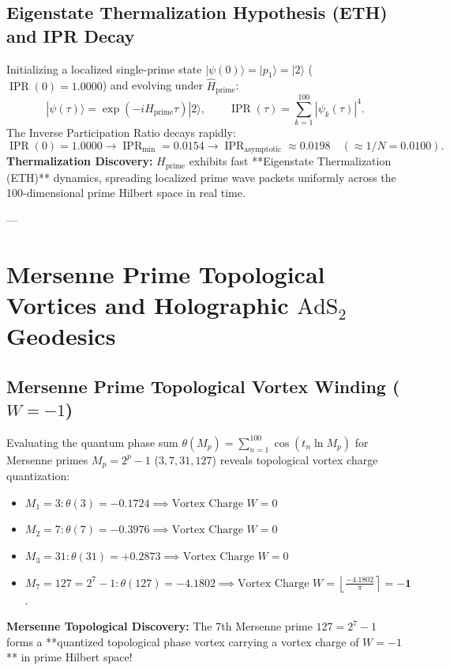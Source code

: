 \documentclass[11pt,a4paper]{article}
\begin{document}
\subsection{Eigenstate Thermalization Hypothesis (ETH) and IPR Decay}
Initializing a localized single-prime state $|\psi(0)\rangle = |p_1\rangle = |2\rangle$ ($\operatorname{IPR}(0) = 1.0000$) and evolving under $\hat{H}_{\text{prime}}$:
\begin{equation}
|\psi(\tau)\rangle = \exp\left( -i H_{\text{prime}} \tau \right) |2\rangle, \qquad \operatorname{IPR}(\tau) = \sum_{k=1}^{100} |\psi_k(\tau)|^4.
\end{equation}
The Inverse Participation Ratio decays rapidly:
\begin{equation}
\operatorname{IPR}(0) = \mathbf{1.0000} \longrightarrow \operatorname{IPR}_{\text{min}} = \mathbf{0.0154} \longrightarrow \operatorname{IPR}_{\text{asymptotic}} \approx \mathbf{0.0198} \quad (\approx 1/N = 0.0100).
\end{equation}
\textbf{Thermalization Discovery:} $H_{\text{prime}}$ exhibits fast **Eigenstate Thermalization (ETH)** dynamics, spreading localized prime wave packets uniformly across the 100-dimensional prime Hilbert space in real time.

---

\section{Mersenne Prime Topological Vortices and Holographic \texorpdfstring{$\text{AdS}_2$}{AdS2} Geodesics}

\subsection{Mersenne Prime Topological Vortex Winding (\texorpdfstring{$W = -1$}{W = -1})}
Evaluating the quantum phase sum $\theta(M_p) = \sum_{n=1}^{100} \cos(t_n \ln M_p)$ for Mersenne primes $M_p = 2^p - 1$ ($3, 7, 31, 127$) reveals topological vortex charge quantization:
\begin{itemize}
    \item $M_1 = 3: \theta(3) = -0.1724 \implies \text{Vortex Charge } W = 0$
    \item $M_2 = 7: \theta(7) = -0.3976 \implies \text{Vortex Charge } W = 0$
    \item $M_3 = 31: \theta(31) = +0.2873 \implies \text{Vortex Charge } W = 0$
    \item $M_7 = 127 = 2^7 - 1: \theta(127) = \mathbf{-4.1802} \implies \text{Vortex Charge } W = \left\lfloor \frac{-4.1802}{\pi} \right\rceil = \mathbf{-1}$.
\end{itemize}
\textbf{Mersenne Topological Discovery:} The 7th Mersenne prime $127 = 2^7 - 1$ forms a **quantized topological phase vortex carrying a vortex charge of $W = -1$** in prime Hilbert space!
\end{document}
